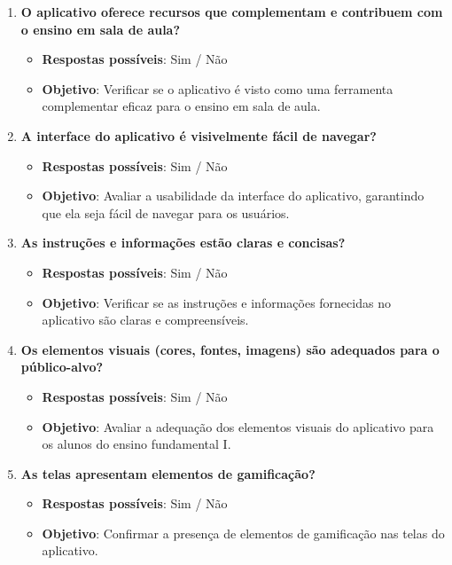 \begin{enumerate}[label=\arabic*.]
    \item \textbf{O aplicativo oferece recursos que complementam e contribuem com o ensino em sala de aula?}
    \begin{itemize}
        \item \textbf{Respostas possíveis}: Sim / Não
        \item \textbf{Objetivo}: Verificar se o aplicativo é visto como uma ferramenta complementar eficaz para o ensino em sala de aula.
    \end{itemize}
    
    \item \textbf{A interface do aplicativo é visivelmente fácil de navegar?}
    \begin{itemize}
        \item \textbf{Respostas possíveis}: Sim / Não
        \item \textbf{Objetivo}: Avaliar a usabilidade da interface do aplicativo, garantindo que ela seja fácil de navegar para os usuários.
    \end{itemize}
    
    \item \textbf{As instruções e informações estão claras e concisas?}
    \begin{itemize}
        \item \textbf{Respostas possíveis}: Sim / Não
        \item \textbf{Objetivo}: Verificar se as instruções e informações fornecidas no aplicativo são claras e compreensíveis.
    \end{itemize}
    
    \item \textbf{Os elementos visuais (cores, fontes, imagens) são adequados para o público-alvo?}
    \begin{itemize}
        \item \textbf{Respostas possíveis}: Sim / Não
        \item \textbf{Objetivo}: Avaliar a adequação dos elementos visuais do aplicativo para os alunos do ensino fundamental I.
    \end{itemize}
    
    \item \textbf{As telas apresentam elementos de gamificação?}
    \begin{itemize}
        \item \textbf{Respostas possíveis}: Sim / Não
        \item \textbf{Objetivo}: Confirmar a presença de elementos de gamificação nas telas do aplicativo.
    \end{itemize}
    

\end{enumerate}
